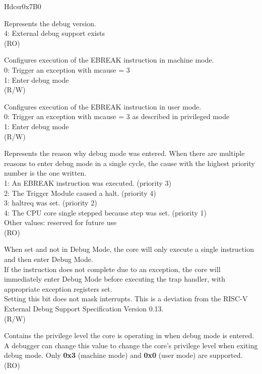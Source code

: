 \begin{register}{H}{dcsr}{0x7B0}\label{regdesc:LPDCSR}
%
%
%
%
%
%
%
%
%
%
\regnewline%
\begin{regdesc}\begin{reglist}
\label{xdebugver}\item [xdebugver] Represents the debug version.\\
4: External debug support exists\\
(RO)
\label{ebreakm}\item [ebreakm] Configures execution of the EBREAK instruction in machine mode.\\
0: Trigger an exception with mcause = 3\\
1: Enter debug mode\\
(R/W)
\label{ebreaku}\item [ebreaku] Configures execution of the EBREAK instruction in user mode.\\
0: Trigger an exception with mcause = 3 as described in privileged mode\\
1: Enter debug mode\\
(R/W)
\label{cause}\item [cause] Represents the reason why debug mode was entered. When there are multiple reasons to enter debug mode in a single cycle, the cause with the highest priority number is the one written.\\
1: An EBREAK instruction was executed. (priority 3)\\
2: The Trigger Module caused a halt. (priority 4)\\
3: haltreq was set. (priority 2)\\
4: The CPU core single stepped because step was set. (priority 1)\\
Other values: reserved for future use\\
(RO)
\label{step}\item [step] When set and not in Debug Mode, the core will only execute a single instruction and then enter Debug Mode. \\
If the instruction does not complete due to an exception, the core will immediately enter Debug Mode before executing the trap handler, with appropriate exception registers set.\\
Setting this bit does not mask interrupts. This is a deviation from the RISC-V External Debug Support Specification Version 0.13.\\
(R/W)
\label{prv}\item [prv] Contains the privilege level the core is operating in when debug mode is entered. A debugger can change this value to change the core's privilege level when exiting debug mode. Only \textbf{0x3} (machine mode) and \textbf{0x0} (user mode) are supported. (RO)
\end{reglist}\end{regdesc}
\end{register}

